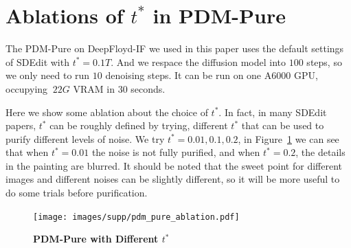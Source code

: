 \section{Ablations of $t^*$ in PDM-Pure}

The PDM-Pure on DeepFloyd-IF we used in this paper uses the default settings of SDEdit with $t^* = 0.1 T$. And we respace the diffusion model into $100$ steps, so we only need to run $10$ denoising steps. It can be run on one A6000 GPU, occupying $~22G$ VRAM in $30$ seconds.

Here we show some ablation about the choice of $t^*$. In fact, in many SDEdit papers, $t^*$ can be roughly defined by trying, different $t^*$ that can be used to purify different levels of noise. We try $t^*=0.01, 0.1, 0.2$, in Figure~\ref{fig:supp:pdm-pure_ablation} we can see that when $t^*=0.01$ the noise is not fully purified, and when $t^*=0.2$, the details in the painting are blurred. It should be noted that the sweet point for different images and different noises can be slightly different, so it will be more useful to do some trials before purification.



\begin{figure}
    \centering
    \texttt{[image: images/supp/pdm\_pure\_ablation.pdf]}
    \caption{\textbf{PDM-Pure with Different $t^*$}}
    \label{fig:supp:pdm-pure_ablation}
\end{figure}





